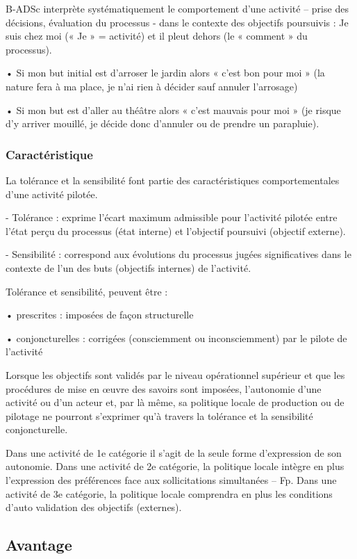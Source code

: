 
B-ADSc interprète systématiquement le comportement d’une activité – prise des décisions, évaluation du processus - dans le contexte des objectifs poursuivis :
Je suis chez moi (« Je » = activité) et il pleut dehors (le « comment » du processus).

• Si mon but initial est d’arroser le jardin alors « c’est bon pour moi » (la nature fera à ma place, je n'ai rien à décider sauf annuler l'arrosage) 

• Si mon but est d’aller au théâtre alors « c’est mauvais pour moi » (je risque d’y arriver mouillé, je décide donc d'annuler ou de prendre un parapluie).\cite{badsc} 


\subsubsection{Caractéristique}

La tolérance et la sensibilité font partie des caractéristiques comportementales d’une activité pilotée.
 
- Tolérance : exprime l’écart maximum admissible pour l'activité pilotée entre l'état perçu du
processus (état interne) et l'objectif poursuivi (objectif externe).
 
- Sensibilité : correspond aux évolutions du processus jugées significatives dans le contexte de
l’un des buts (objectifs internes) de l’activité.
 
Tolérance et sensibilité, peuvent être :
 
• prescrites : imposées de façon structurelle

• conjoncturelles : corrigées (consciemment ou inconsciemment) par le pilote de l’activité
 
Lorsque les objectifs sont validés par le niveau opérationnel supérieur et que les procédures de mise en œuvre des savoirs sont imposées, l’autonomie d’une activité ou d’un acteur et, par là même, sa politique locale de production ou de pilotage ne pourront s’exprimer qu’à travers la tolérance et la sensibilité conjoncturelle.
 
Dans une activité de 1e catégorie il s'agit de la seule forme d’expression de son autonomie.
Dans une activité de 2e catégorie, la politique locale intègre en plus l’expression des préférences
face aux sollicitations simultanées – Fp.
Dans une activité de 3e catégorie, la politique locale comprendra en plus les conditions d’auto
validation des objectifs (externes). \cite{activite}

\subsection{Avantage}

